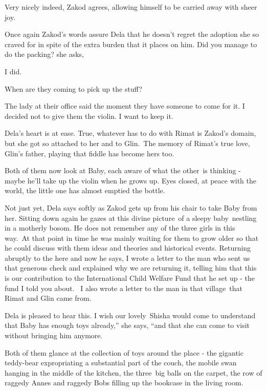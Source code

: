 \documentclass[twoside,11pt]{book}
\begin{document}
{\textquotedbl}Very nicely indeed,{\textquotedbl} Zakod agrees, allowing himself to be carried away with sheer joy.

Once again Zakod's words assure Dela that he doesn't regret the adoption she so craved for in spite of the extra burden
that it places on him. {\textquotedbl}Did you manage to do the packing?{\textquotedbl} she asks,

{\textquotedbl}I did.{\textquotedbl} 

{\textquotedbl}When are they coming to pick up the stuff?{\textquotedbl} 

{\textquotedbl}The lady at their office said the moment they have someone to come for it. I decided not to give them the
violin. I want to keep it.{\textquotedbl}

Dela{}'s heart is at ease. True, whatever has to do with Rimat is Zakod's domain, but she got so attached to her and to
Glin.\ The memory of Rimat's true love, Glin's father, playing that fiddle has become hers too. 

Both of them now look at Baby, each aware of what the other~is thinking - maybe he'll take up the violin when he grows
up. Eyes closed, at peace with the world, the little one has almost emptied the bottle.\ 

{\textquotedbl}Not just yet,{\textquotedbl} Dela says softly as Zakod gets up from his chair to take Baby from her.
Sitting down again he gazes at this divine picture~of a sleepy baby~nestling in a motherly bosom. He does not remember
any of the three girls in this way.\ At that point in time he was mainly waiting for them to grow older so that he
could discuss with them ideas and theories and historical events. Returning abruptly to the here and now he says,
{\textquotedbl}I wrote a letter to the man who sent us that generous check and explained why we are returning it,
telling him that this is our contribution to the International Child Welfare Fund that he set up - the fund I told you
about. ~I also wrote a letter to the man in that village\ that Rimat and Glin came from.{\textquotedbl} 

Dela is pleased to hear this. {\textquotedbl}I wish our lovely~Shisha would come to understand that Baby has enough toys
already,'' she says, ``and that she can come to visit without bringing him anymore.{\textquotedbl}

Both of them glance at the collection of toys around the place - the gigantic teddy-bear expropriating a substantial
part of the couch, the mobile swan hanging in the middle of the kitchen, the three~big balls on the carpet, the row of
raggedy Annes and raggedy Bobs filling up the bookcase in the living room. 
\end{document}
